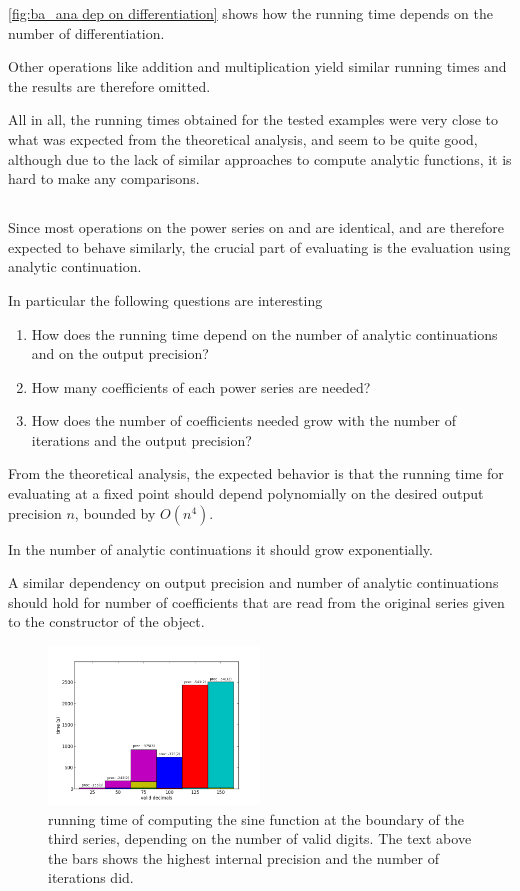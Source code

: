       \ref{fig:ba_ana dep on differentiation} shows how the running time
      depends on the number of differentiation. 

      Other operations like addition and multiplication yield similar running times and the results are therefore omitted.

      All in all, the running times obtained for the tested examples were very close to what was expected from the theoretical analysis, and seem to
      be quite good, although due to the lack of similar approaches to compute analytic functions, it is hard to make any comparisons.

      \subsection{\anarect}
			Since most operations on the power series on \anarect and \baana are identical‚ and are therefore expected to behave similarly, 
			the crucial part of evaluating \baana is the evaluation using analytic continuation.
			
			In particular the following questions are interesting
			\begin{enumerate}
				\item How does the running time depend on the number of analytic continuations and on the output precision?
				\item How many coefficients of each power series are needed?
				\item How does the number of coefficients needed grow with the number of iterations and the output precision?
			\end{enumerate} 

		From the theoretical analysis, the expected behavior is that the running time for evaluating at a fixed 
		point should depend polynomially on the desired output precision $n$, bounded by $O(n^4)$.

    In the number of analytic continuations it should grow exponentially.
    
    A similar dependency on output precision and number of analytic continuations should hold for number of coefficients that are read 
    from the original series given to the constructor of the \anarect object.


		\begin{figure}[h]
			\centering
			\includegraphics[width=0.5\textwidth]{img/analytic/sin_for_series_4_dep_on_n.png}
			\caption{running time of \anarect computing the sine function at the boundary of the third series, depending on the number of valid digits. The text above the bars shows the highest internal precision and the number of iterations \irram did.}
			\label{fig:sin dep on n}
		\end{figure}

